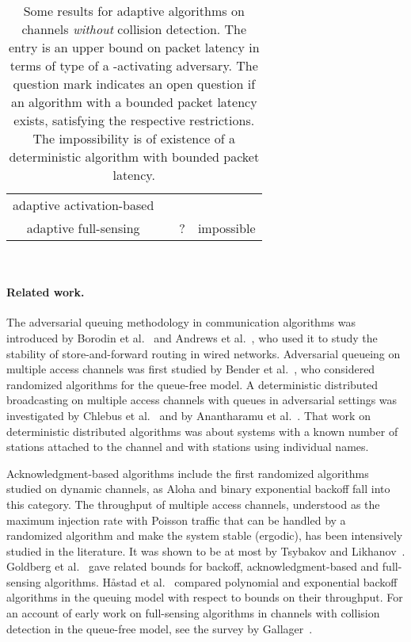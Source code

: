 \documentclass[11pt]{article}
\newcommand{\BBB}{\vspace*{-\bigskipamount}}
\newcommand{\Paragraph}[1]{\BBB\paragraph{#1}}
\newlength{\pagewidth}
\newcommand{\RB}{\raisebox{2.5ex}{~}}
\newcommand{\LB}{\raisebox{-1.5ex}{~}}
\begin{document}
\begin{table}
\begin{center}
\begin{tabular}{|c ||c |c |c |}
\hline
\RB \LB
&  
&&\\
\hline\hline
\RB \LB
\textsf{adaptive activation-based }  &&& \\
\hline
\RB \LB
\textsf{adaptive full-sensing }  &&?& impossible\\
\hline
\end{tabular}
\parbox{\pagewidth}{
~
\caption{\label{tab:no-collision-detection}
Some results for adaptive algorithms on channels \emph{without} collision detection.
The entry  is an upper bound on packet latency in terms of type  of a -activating adversary.
The question mark indicates an open question if an algorithm with a bounded packet latency exists,  satisfying the respective restrictions.
The impossibility is of existence of a deterministic algorithm with bounded packet latency.
}}
\end{center}
\end{table}



\Paragraph{Related work.}



The adversarial queuing methodology in communication algorithms was introduced by Borodin et al.~\cite{BorodinKRSW-JACM01} and Andrews et al.~\cite{AndrewsAFLLK-JACM01}, who  used it to study the stability of store-and-forward routing in wired networks.
Adversarial queueing on multiple access channels was first studied by Bender et al.~\cite{BenderFHKL05}, who considered  randomized algorithms for the queue-free model.
A deterministic distributed broadcasting on multiple access channels with queues in adversarial settings was investigated by Chlebus et al.~\cite{ChlebusKR09,ChlebusKR-TALG12} and by Anantharamu et al.~\cite{AnantharamuCKR-INFOCOM10, AnantharamuCKR-SIROCCO11, AnantharamuCR-OPODIS09}.
That work on deterministic distributed algorithms was about systems with a known number of stations attached to the channel and with stations using individual names.


Acknowledgment-based algorithms include the first randomized algorithms studied on dynamic channels, as Aloha and binary exponential backoff fall into this category.
The throughput of multiple access channels, understood as the maximum injection rate with Poisson traffic that can be handled by a randomized algorithm and make the system stable (ergodic), has been intensively studied in the literature.
It was shown to be at most  by Tsybakov and Likhanov~\cite{TsybakovL87}. 
Goldberg et al.~\cite{GoldbergJKP04} gave related bounds for backoff, acknowledgment-based and full-sensing algorithms.
H{\aa }stad et al.~\cite{HastadLR-SICOMP96} compared polynomial and exponential backoff algorithms in the queuing model with respect to bounds on their throughput.
For an  account of early work on full-sensing algorithms in channels with collision detection in the queue-free model, see the survey by Gallager~\cite{Gallager-TIT85}.
\end{document}
